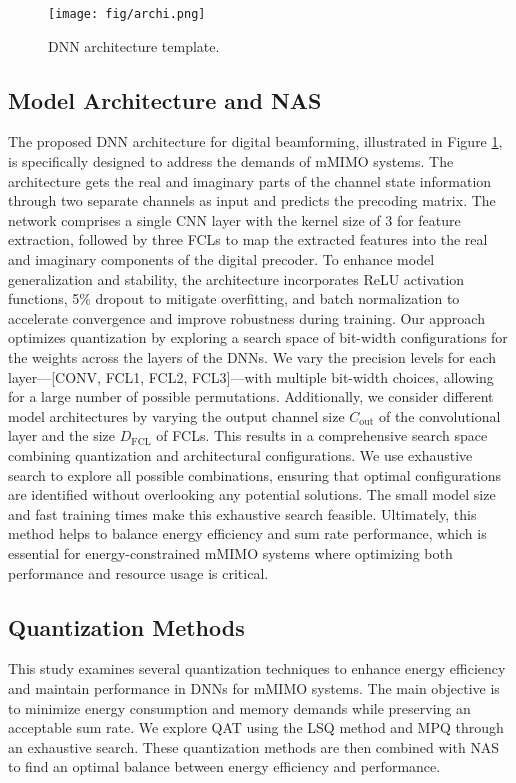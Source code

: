 \begin{figure}[!t]
\texttt{[image: fig/archi.png]}
\caption{DNN architecture template.}
\label{fig:DNN}
\end{figure}
\subsection{Model Architecture and NAS}
The proposed \gls{DNN} architecture for digital beamforming, illustrated in Figure \ref{fig:DNN}, is specifically designed to address the demands of \gls{mMIMO} systems. The architecture gets the real and imaginary parts of the channel state information through two separate channels as input and predicts the precoding matrix. The network comprises a single \gls{CNN} layer with the kernel size of 3 for feature extraction, followed by three \glspl{FCL} to map the extracted features into the real and imaginary components of the digital precoder. To enhance model generalization and stability, the architecture incorporates ReLU activation functions, 5\% dropout to mitigate overfitting, and batch normalization to accelerate convergence and improve robustness during training.
Our approach optimizes quantization by exploring a search space of bit-width configurations for the weights across the layers of the \glspl{DNN}. We vary the precision levels for each layer—[CONV, FCL1, FCL2, FCL3]—with multiple bit-width choices, allowing for a large number of possible permutations. Additionally, we consider different model architectures by varying the output channel size \(C_{\text{out}}\) of the convolutional layer and the size \(D_{\text{FCL}}\) of \glspl{FCL}. This results in a comprehensive search space combining quantization and architectural configurations. We use exhaustive search to explore all possible combinations, ensuring that optimal configurations are identified without overlooking any potential solutions. The small model size and fast training times make this exhaustive search feasible. Ultimately, this method helps to balance energy efficiency and sum rate performance, which is essential for energy-constrained \gls{mMIMO} systems where optimizing both performance and resource usage is critical.


\subsection{Quantization Methods}

This study examines several quantization techniques to enhance energy efficiency and maintain performance in \glspl{DNN} for \gls{mMIMO} systems. The main objective is to minimize energy consumption and memory demands while preserving an acceptable sum rate. We explore \gls{QAT} using the \gls{LSQ} method \cite{Esser2020LEARNED} and \gls{MPQ} through an exhaustive search. These quantization methods are then combined with \gls{NAS} to find an optimal balance between energy efficiency and performance.

